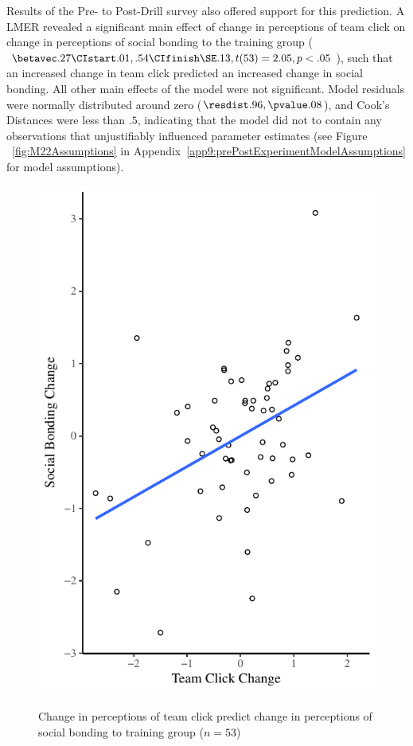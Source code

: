 Results of the Pre- to Post-Drill survey also offered support for this prediction.  A LMER revealed a significant main effect of change in perceptions of team click on change in perceptions of social bonding to the training group ($\betavec .27 \CIstart .01, .54 \CIfinish \SE .13, t(53) = 2.05, p < .05$), such that an increased change in team click predicted an increased change in social bonding.  All other main effects of the model were not significant. Model residuals were normally distributed around zero ($\resdist .96, \pvalue .08$), and Cook's Distances were less than $.5$, indicating that the model did not to contain any observations that unjustifiably influenced parameter estimates (see Figure ~\ref{fig:M22Assumptions} in Appendix~\ref{app9:prePostExperimentModelAssumptions} for model assumptions).






\begin{figure}
  \centering
    \includegraphics[width=0.5\linewidth,keepaspectratio] {images/groupClickBondingChangeCondition}
    \label{fig:groupClickBondingChangeCondition}
    \caption{Change in perceptions of team click predict change in perceptions of social bonding to training group ($n = 53$)}
\end{figure}

